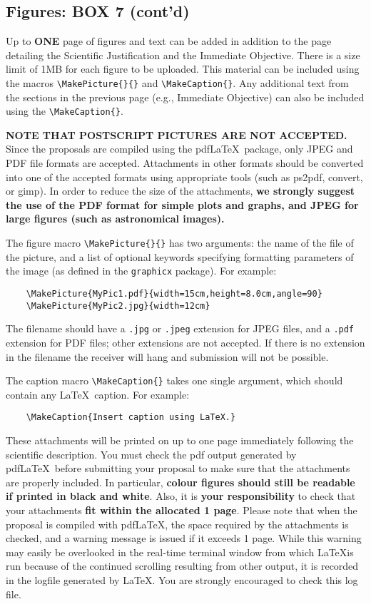 \documentclass{article}
\begin{document}
\subsection{Figures: {\bf BOX 7 (cont'd)}}

Up to {\bf ONE} page of figures and text can be added in addition to the 
page detailing the Scientific Justification and the Immediate Objective.
There is a size limit of 1MB for each figure to be uploaded.
This material can be included using the 
macros \verb|\MakePicture{}{}| and \verb|\MakeCaption{}|. Any
additional text from the sections in the previous page (e.g.,
Immediate Objective) can also be included using the 
\verb|\MakeCaption{}|.

{\bf NOTE THAT POSTSCRIPT PICTURES ARE NOT ACCEPTED.} Since the
proposals are compiled using the pdf\LaTeX\ package, only JPEG and PDF
file formats are accepted.  Attachments in other formats should be
converted into one of the accepted formats using appropriate tools
(such as ps2pdf, convert, or gimp).  In order to reduce the size of
the attachments, {\bf we strongly suggest the use of the PDF format for
simple plots and graphs, and JPEG for large figures (such as
astronomical images).} 

The figure macro \verb|\MakePicture{}{}| has two arguments: the name
of the file of the picture, and a list of optional keywords specifying
formatting parameters of the image (as defined in the {\tt graphicx}
package). For example:
\begin{verbatim}
    \MakePicture{MyPic1.pdf}{width=15cm,height=8.0cm,angle=90}
    \MakePicture{MyPic2.jpg}{width=12cm}
\end{verbatim}
The filename should have a {\tt .jpg} or {\tt .jpeg} extension for
JPEG files, and a {\tt .pdf} extension for PDF files; other extensions
are not accepted. If there is no extension in the filename the receiver
will hang and submission will not be possible.

The caption macro \verb|\MakeCaption{}| takes one single  argument,
which should contain any \LaTeX\ caption. For example:
\begin{verbatim}
    \MakeCaption{Insert caption using LaTeX.}
\end{verbatim}

These attachments will be printed on up to one page
immediately following the scientific description. You must check the
pdf output generated by pdf\LaTeX\ before submitting your proposal to
make sure that the attachments are properly included. In particular,
{\bf colour figures should still be readable if printed in  
black and white}. Also,
it is {\bf your responsibility} to check that your attachments 
{\bf fit within the allocated 1 page}. Please note that
when the proposal is compiled with pdf\LaTeX, the space required by
the attachments is checked, and a warning message is issued if it 
exceeds 1 page. While this warning may easily be overlooked in the
real-time terminal window from which \LaTeX is run because of the
continued scrolling resulting from other output, it is recorded in the
logfile generated by LaTeX. You are strongly encouraged to check
this log file.
\end{document}
